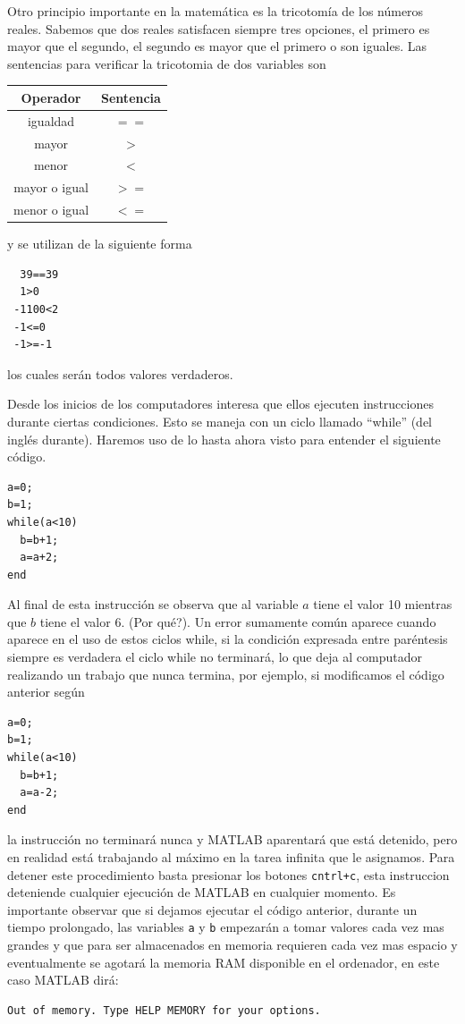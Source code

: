 \documentclass[11pt]{article}
\begin{document}
Otro principio importante en la matem\'atica es la tricotom\'ia de los n\'umeros reales. Sabemos que dos reales satisfacen siempre 
tres opciones, el primero es mayor que el segundo, el segundo es mayor que el primero o son iguales. Las sentencias 
para verificar la tricotomia de dos variables son
\begin{center}
\begin{tabular}{c|c}
 \hline
 Operador 		& Sentencia \\
 \hline
  igualdad		& $==$\\
  mayor			& $>$\\	
  menor			& $<$\\
  mayor o igual		& $>=$\\
  menor o igual		& $<=$	
\end{tabular}
\end{center}
y se utilizan de la siguiente forma
\begin{verbatim}
  39==39
  1>0
 -1100<2
 -1<=0
 -1>=-1
\end{verbatim}
los cuales ser\'an todos valores verdaderos.

Desde los inicios de los computadores interesa que ellos ejecuten instrucciones durante ciertas condiciones. Esto 
se maneja con un ciclo llamado ``while'' (del ingl\'es durante). Haremos uso de lo hasta ahora visto para entender el 
siguiente c\'odigo.
\begin{verbatim}
a=0;
b=1;
while(a<10)
  b=b+1;
  a=a+2;
end
\end{verbatim}
Al final de esta instrucci\'on se observa que al variable $a$ tiene el valor 10 mientras que $b$ tiene el valor 6.
(\textquestiondown Por qu\'e?). Un error sumamente com\'un aparece cuando aparece en el uso de estos ciclos while, si la 
condici\'on expresada entre par\'entesis siempre es verdadera el ciclo while no terminar\'a, lo que deja al computador 
realizando un trabajo que nunca termina, por ejemplo, si modificamos el c\'odigo anterior seg\'un 
\begin{verbatim}
a=0;
b=1;
while(a<10)
  b=b+1;
  a=a-2;
end
\end{verbatim}
la instrucci\'on no terminar\'a nunca y MATLAB aparentar\'a que est\'a detenido, pero en realidad est\'a trabajando al m\'aximo 
en la tarea infinita que le asignamos. Para detener este procedimiento basta presionar los botones \texttt{cntrl+c}, esta 
instruccion deteniende cualquier ejecuci\'on de MATLAB en cualquier momento. Es importante observar que si dejamos 
ejecutar el c\'odigo anterior, durante un tiempo prolongado, las variables \texttt{a} y \texttt{b} empezar\'an a tomar valores 
cada vez mas grandes y que para ser almacenados en memoria requieren cada vez mas espacio y eventualmente se agotar\'a la memoria 
RAM disponible en el ordenador, en este caso MATLAB dir\'a:
\begin{verbatim}
Out of memory. Type HELP MEMORY for your options.
\end{verbatim}
%
\end{document}
